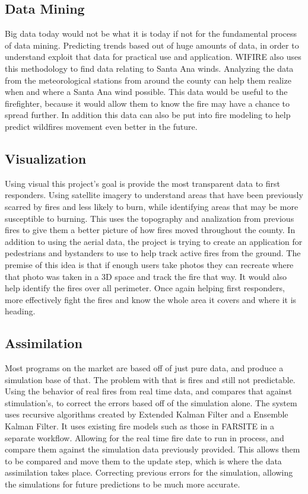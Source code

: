 \documentclass[sigconf]{acmart}
\begin{document}
\subsection{Data Mining}
Big data today would not be what it is today if not for the fundamental 
process of data mining.  Predicting trends based out of huge amounts of 
data, in order to understand exploit that data for practical use and 
application. WIFIRE also uses this methodology to find data relating to 
Santa Ana winds.  Analyzing the data from the meteorological stations 
from around the county can help them realize when and where a Santa Ana 
wind possible. This data would be useful to the firefighter, because it 
would allow them to know the fire may have a chance to spread 
further.  In addition this data can also be put into fire modeling to 
help predict wildfires movement even better in the future.
\subsection{Visualization}
Using visual this project's goal is provide the most transparent data 
to first responders. Using satellite imagery to understand areas that 
have been previously scarred by fires and less likely to burn, while 
identifying areas that may be more susceptible to burning.  This uses 
the topography and analization from previous fires to give them a 
better picture of how fires moved throughout the county.
In addition to using the aerial data, the project is trying to create 
an application for pedestrians and bystanders to use to help track 
active fires from the ground.  The premise of this idea is that if 
enough users take photos they can recreate where that photo was taken 
in a 3D space and track the fire that way.  It would also help identify 
the fires over all perimeter.  Once again helping first responders, 
more effectively fight the fires and know the whole area it covers and 
where it is heading.
\subsection{Assimilation}
Most programs on the market are based off of just pure data, and 
produce a simulation base of that.  The problem with that is fires and 
still not predictable.  Using the behavior of real fires from real time 
data, and compares that against stimulation's, to correct the errors 
based off of the simulation alone. The system uses recursive algorithms 
created by Extended Kalman Filter and a Ensemble Kalman Filter.   It 
uses existing fire models such as those in FARSITE in a separate 
workflow.  Allowing for the real time fire date to run in process, and 
compare them against the simulation data previously provided.  This 
allows them to be compared and move them to the update step, which is 
where the data assimilation takes place.  Correcting previous errors 
for the simulation, allowing the simulations for future predictions to 
be much more accurate.
\end{document}
